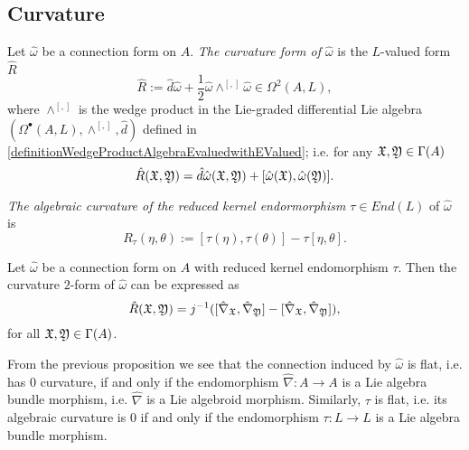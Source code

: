 \linea

\subsection{Curvature}
\begin{definition}
Let $\hat \omega$ be a connection form on $A$. \emph{The curvature form of $\hat \omega$} is the $L$-valued form $\hat R$
\begin{equation}
    \hat R := \hat d \hat \omega + \frac{1}{2} \hat \omega \wedge^{[,]} \hat \omega \in \Omega^2(A, L),
\end{equation}
where $\wedge^{[,]}$ is the wedge product in the Lie-graded differential Lie algebra $(\Omega^\bullet(A, L), \wedge^{[, ]}, \hat d)$ defined in \ref{definitionWedgeProductAlgebraEvaluedwithEValued}; i.e. for any $\mathfrak{X}, \mathfrak{Y} \in \Gamma(A)$
\begin{equation}
    \hat R(\mathfrak{X}, \mathfrak{Y}) = \hat d \hat \omega (\mathfrak{X}, \mathfrak{Y}) + [\hat \omega(\mathfrak{X}), \hat \omega(\mathfrak{Y})].
\end{equation}

\emph{The algebraic curvature of the reduced kernel endormorphism} $\tau \in End(L)$ of $\hat \omega$ is
\begin{equation}
    R_\tau(\eta, \theta) := [\tau(\eta), \tau(\theta)] - \tau[\eta, \theta]. 
\end{equation}
\end{definition}

\begin{proposition}
Let $\hat \omega$ be a connection form on $A$ with reduced kernel endomorphism $\tau$. Then the curvature $2$-form of $\hat \omega$ can be expressed as
\begin{equation}
    \hat R(\mathfrak{X}, \mathfrak{Y}) = j^{-1}([\hat \nabla_{\mathfrak{X}}, \hat \nabla_{\mathfrak{Y}}] - [\hat \nabla_{\mathfrak{X}}, \hat \nabla_{\mathfrak{Y}}]),
\end{equation}
for all $\mathfrak{X}, \mathfrak{Y} \in \Gamma(A)$.
\end{proposition}

\begin{remark}
From the previous proposition we see that the connection induced by $\hat \omega$ is flat, i.e. has $0$ curvature, if and only if the endomorphism $\hat \nabla: A \to A$ is a Lie algebra bundle morphism, i.e. $\hat \nabla$ is a Lie algebroid morphism. Similarly, $\tau$ is flat, i.e. its algebraic curvature is $0$ if and only if the endomorphism $\tau: L \to L$ is a Lie algebra bundle morphism. 
\end{remark}

